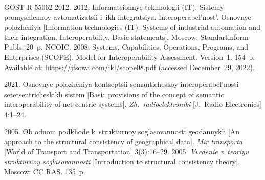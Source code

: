 
  


  \begin{multicols}{2}

\renewcommand{\bibname}{\protect\rmfamily References}

{\small\frenchspacing
 {%
 \begin{thebibliography}{9} 
GOST R 55062-2012. 2012. {Informatsionnye tekhnologii (IT). Sis\-te\-my pro\-mysh\-len\-noy av\-to\-ma\-ti\-za\-tsii i~ikh in\-teg\-ra\-tsiya. 
Inter\-ope\-ra\-bel'\-nost'. Osnovnye polozheniya} [Information technologies (IT). Systems of industrial automation and their integration. 
Interoperability. Basic statements]. Moscow: Standartinform Publs. 20~p. 
NCOIC.  2008. {Systems, Capabilities, Operations, Programs, and 
Enterprises (SCOPE). Model for Interoperability Assessment}. Version~1. 154~p. Available at: {\sf 
https://\linebreak jfsowa.com/ikl/scope08.pdf} (accessed December~29, 2022).


 2021. Osnov\-nye po\-lo\-zhe\-niya kon\-tsep\-tsii 
se\-man\-ti\-che\-skoy in\-ter\-ope\-ra\-bel'\-nosti se\-te\-tsent\-ri\-che\-skikh sis\-tem [Basic provisions of the concept of 
semantic interoperability of net-centric systems]. \textit{Zh.\ radioelektroniki} [J.~Radio Electronics] 
4:1--24. 


 2005. Ob od\-nom pod\-kho\-de k~struk\-tur\-noy so\-gla\-so\-van\-nosti 
geo\-dan\-nykh [An approach to the structural consistency of geographical data]. \textit{Mir transporta} [World of 
Transport and Transportation] 3(3):16--29.
 2005. \textit{Vve\-de\-nie v~teo\-riyu struk\-tur\-noy so\-gla\-so\-van\-nosti} [Introduction to 
structural consistency theory]. Moscow: CC RAS. 135~p.

\end{thebibliography}

 }
 }

\end{multicols}

\vspace*{-6pt}

